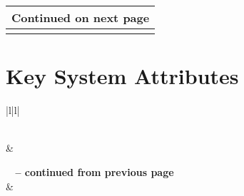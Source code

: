 {{\begin{center}
\begin{longtable}[H]{|l|l|}
\hline \hline \multicolumn{2}{|r|}{{Continued on next page}} \\ \hline \hline
\endfoot

\hline \hline
\endlastfoot




\end{longtable}
\end{center}
}%

\newpage
\section{Key System Attributes}
\label{lab:sec_Bspec_KSA}

{%
\singlespace
\renewcommand{\baselinestretch}{1.0}%
\renewcommand*{\arraystretch}{1.0}%

\newlength{\KsaVspace}
\setlength{\KsaVspace}{4 pt}

\newlength{\KsaRightColumnWidth}
\setlength{\KsaRightColumnWidth}{4.5in}%
	
\begin{center}

\begin{longtable}[H]{|l|l|} %
\caption{Key System Attribute Specifications} \\

\hline \hline
{} & 
 \\
\hline \hline 
\endfirsthead

%
{{\bfseries \tablename\ \thetable{} -- continued from previous page}} \\
\hline \hline 
{}  
& 
 \\
\hline \hline 
\endhead


\end{longtable}
\end{center}}}
